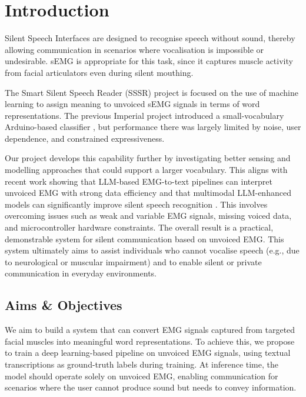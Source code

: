 \section{Introduction}

Silent Speech Interfaces are designed to recognise speech without sound, thereby allowing communication in scenarios where vocalisation is impossible or undesirable. sEMG is appropriate for this task, since it captures muscle activity from facial articulators even during silent mouthing.

The Smart Silent Speech Reader (SSSR) project is focused on the use of machine learning to assign meaning to unvoiced sEMG signals in terms of word representations. The previous Imperial project introduced a small-vocabulary Arduino-based classifier \citep{sun2022}, but performance there was largely limited by noise, user dependence, and constrained expressiveness.

Our project develops this capability further by investigating better sensing and modelling approaches that could support a larger vocabulary. This aligns with recent work showing that LLM-based EMG-to-text pipelines can interpret unvoiced EMG with strong data efficiency \citep{mohapatra2025} and that multimodal LLM-enhanced models can significantly improve silent speech recognition \citep{benster2024}. This involves overcoming issues such as weak and variable EMG signals, missing voiced data, and microcontroller hardware constraints. The overall result is a practical, demonstrable system for silent communication based on unvoiced EMG. This system ultimately aims to assist individuals who cannot vocalise speech (e.g., due to neurological or muscular impairment) and to enable silent or private communication in everyday environments.

\subsection{Aims \& Objectives}

We aim to build a system that can convert EMG signals captured from targeted facial muscles into meaningful word representations. To achieve this, we propose to train a deep learning-based pipeline on unvoiced EMG signals, using textual transcriptions as ground-truth labels during training. At inference time, the model should operate solely on unvoiced EMG, enabling communication for scenarios where the user cannot produce sound but needs to convey information.


